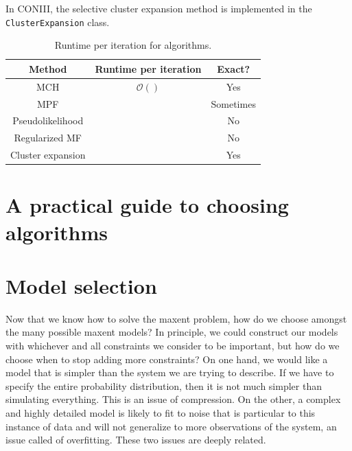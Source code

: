\documentclass[aps,prl,twocolumn]{revtex4-1}
\begin{document}
In CONIII, the selective cluster expansion method is implemented in the {\tt ClusterExpansion} class.

%

\begin{table}[bt]
\caption{Runtime per iteration for algorithms.}
\begin{center}
\begin{tabular}{|c|c|c|}
\hline
	Method 	& Runtime per iteration & Exact? \\
\hline
	MCH 	& $\mathcal{O}()$ & Yes\\
	MPF		& & Sometimes\\
	Pseudolikelihood & & No\\
	Regularized MF & & No\\
	Cluster expansion & & Yes\\
\hline
\end{tabular}
\end{center}
\label{tb:runtime}
\end{table}%

\section{A practical guide to choosing algorithms}

\section{Model selection}

Now that we know how to solve the maxent problem, how do we choose amongst the many possible maxent models? In principle, we could construct our models with whichever and all constraints we consider to be important, but how do we choose when to stop adding more constraints? 
On one hand, we would like a model that is simpler than the system we are trying to describe. If we have to specify the entire probability distribution, then it is not much simpler than simulating everything. This is an issue of compression.
On the other, a complex and highly detailed model is likely to fit to noise that is particular to this instance of data and will not generalize to more observations of the system, an issue called of overfitting.
These two issues are deeply related.
\end{document}
